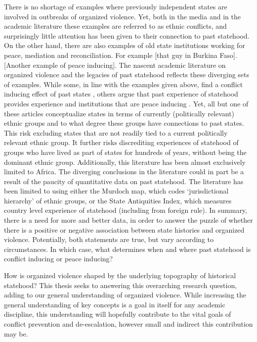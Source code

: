 \documentclass[12pt]{article}
\begin{document}
There is no shortage of examples where previously independent states are
involved in outbreaks of organized violence. Yet, both in the media and in the
academic literature these examples are referred to as ethnic conflicts, and
surprisingly little attention has been given to their connection to past
statehood. On the other hand, there are also examples of old state institutions
working for peace, mediation and reconciliation. For example [that guy in
Burkina Faso]. [Another example of peace inducing]. The nascent academic
literature on organized violence and the legacies of past statehood reflects
these diverging sets of examples. While some, in line with the examples given
above, find a conflict inducing effect of past states \citep{Englebert2002,
Paine2019}, others argue that past experience of statehood provides experience
and institutions that are peace inducing \citep{Wig2016, Wig2018,
Depetris-Chauvin2016}. Yet, all but one of these articles conceptualize states
in terms of currently (politically relevant) ethnic groups and to what degree
these groups have connections to past states. This risk excluding states that
are not readily tied to a current politically relevant ethnic group. It further
risks discrediting experiences of statehood of groups who have lived as part of
states for hundreds of years, without being the dominant ethnic group.
Additionally, this literature has been almost exclusively limited to Africa. The
diverging conclusions in the literature could in part be a result of the paucity
of quantitative data on past statehood. The literature has been limited to using
either the Murdoch map, which codes `jurisdictional hierarchy' of ethnic
groups, or the State Antiquities Index, which measures country level experience
of statehood (including from foreign rule). In summary, there is a need for more
and better data, in order to answer the puzzle of whether there is a positive or
negative association between state histories and organized violence.
Potentially, both statements are true, but vary according to circumstances. In
which case, what determines when and where past statehood is conflict inducing
or peace inducing?


How is organized violence shaped by the underlying topography of historical
statehood? This thesis seeks to answering this overarching research question,
adding to our general understanding of organized violence. While increasing the
general understanding of key concepts is a goal in itself for any academic
discipline, this understanding will hopefully contribute to the vital goals of
conflict prevention and de-escalation, however small and indirect this
contribution may be.
\end{document}
